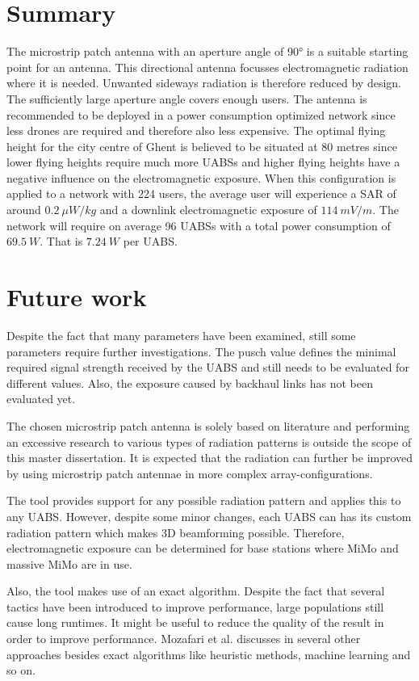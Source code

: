 \section{Summary}
The microstrip patch antenna with an aperture angle of \ang{90} is a suitable starting point for an antenna. 
This directional antenna focusses electromagnetic radiation where it is needed. Unwanted sideways radiation 
is therefore reduced by design.
The sufficiently large aperture angle covers enough users. The antenna is recommended to be deployed in a power consumption 
optimized network since less drones are required and therefore also less expensive.
The optimal flying height for the city centre of Ghent is believed to be situated at 80 metres since lower flying heights require much more \gls{UABS}s and
higher flying heights have a negative influence on the electromagnetic exposure.  
When this configuration is applied to a network with 224 users, the average user will 
experience a SAR of around $0.2\ \mu W/kg$ and
 a downlink electromagnetic exposure of $114\ mV/m$. The network will require on average 96 UABSs with a total
power consumption of $69.5\ W$. That is $7.24\ W$ per UABS.

\section{Future work}

Despite the fact that many parameters have been examined, still some parameters require further investigations.
The \gls{pusch} value defines the minimal required signal strength received by the \gls{UABS} and still needs to be evaluated
for different values. Also, the exposure caused by backhaul links has not been evaluated yet.

The chosen microstrip patch antenna is solely based on literature and performing an excessive research to various 
types of radiation patterns is outside the scope of this master dissertation. It is expected that the radiation can 
further be improved by using microstrip patch antennae in more complex array-configurations. 

The tool provides support for any possible radiation pattern and applies this to any \gls{UABS}.
However, despite some minor changes, each \gls{UABS} can has its custom radiation pattern which makes 
3D beamforming possible. Therefore, electromagnetic exposure can be determined for base stations where MiMo
and massive MiMo are in use.

Also, the tool makes use of an \gls{exact algorithm}. Despite the fact that several  
tactics have been introduced to improve performance, large populations still cause long runtimes. It might be useful 
to reduce the quality of the result in order to improve performance. Mozafari et al. discusses in \cite{U3} several 
other approaches besides \gls{exact algorithm}s like heuristic methods, machine learning and so on.